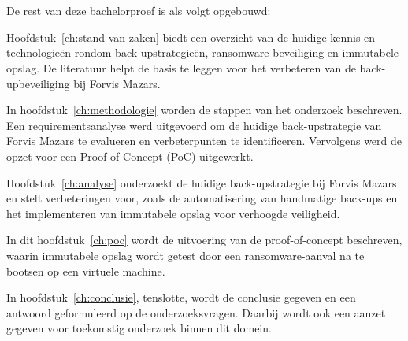 \section{}%
\label{sec:opzet-bachelorproef}


De rest van deze bachelorproef is als volgt opgebouwd:

Hoofdstuk~\ref{ch:stand-van-zaken} biedt een overzicht van de huidige kennis en technologieën rondom back-upstrategieën, ransomware-beveiliging en immutabele opslag. De literatuur helpt de basis te leggen voor het verbeteren van de back-upbeveiliging bij Forvis Mazars.

In hoofdstuk~\ref{ch:methodologie} worden de stappen van het onderzoek beschreven. Een requirementsanalyse werd uitgevoerd om de huidige back-upstrategie van Forvis Mazars te evalueren en verbeterpunten te identificeren. Vervolgens werd de opzet voor een Proof-of-Concept (PoC) uitgewerkt.

Hoofdstuk~\ref{ch:analyse} onderzoekt de huidige back-upstrategie bij Forvis Mazars en stelt verbeteringen voor, zoals de automatisering van handmatige back-ups en het implementeren van immutabele opslag voor verhoogde veiligheid.

In dit hoofdstuk~\ref{ch:poc} wordt de uitvoering van de proof-of-concept beschreven, waarin immutabele opslag wordt getest door een ransomware-aanval na te bootsen op een virtuele machine.

In hoofdstuk~\ref{ch:conclusie}, tenslotte, wordt de conclusie gegeven en een antwoord geformuleerd op de onderzoeksvragen. Daarbij wordt ook een aanzet gegeven voor toekomstig onderzoek binnen dit domein.
